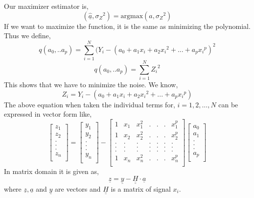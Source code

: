 \noindent Our maximizer estimator is,
$$ (\underline{\hat{a}}, {\sigma_Z}^2) = \text{argmax}(a, {\sigma_Z}^2)   $$
\noindent If we want to maximize the function, it is the same as minimizing the polynomial. Thus we define,
$$ q(a_0,..a_p) = \sum_{i=1}^{N} {(Y_i -( a_0 + a_1 x_i + a_2 {x_i}^2 + ...+ a_p {x_i}^p) }^2 $$
$$ q(a_0,..a_p) = \sum_{i=1}^{N} {Z_i }^2 $$
\noindent This shows that we have to minimize the noise. We know,\\
$$ Z_i = Y_i -( a_0 + a_1 x_i + a_2 {x_i}^2 + ...+ a_p {x_i}^p) $$
\noindent The above equation when taken the individual terms for, $i = 1,2,...,N$ can be expressed in vector form like,
\[
\begin{bmatrix}
z_1\\
z_2\\
.\\
.\\
.\\
z_n\\
\end{bmatrix}
=
\begin{bmatrix}
y_1\\
y_2\\
.\\
.\\
.\\
y_n\\
\end{bmatrix}
-
\begin{bmatrix}
1 & x_1 & x_1^2 & . & . & . & x_1^p \\ 
1 & x_2 & x_2^2 & . & . & . & x_2^p \\
. & . & . & . & . & . & . \\
. & . & . & . & . & . & . \\
. & . & . & . & . & . & . \\
1 & x_n & x_n^2 & . & . & . & x_n^p \\
\end{bmatrix}
\begin{bmatrix}
a_0\\
a_1\\
.\\
.\\
.\\
a_p\\
\end{bmatrix}
\]
\noindent In matrix domain it is given as,
$$ \underline{z} = \underline{y} - \underline{\underline{H}} \cdot \underline{a}$$
\noindent where $\underline{z}, \underline{a}$ and $\underline{y}$ are vectors and $\underline{\underline{H}}$ is a matrix of signal $x_i.$\\
